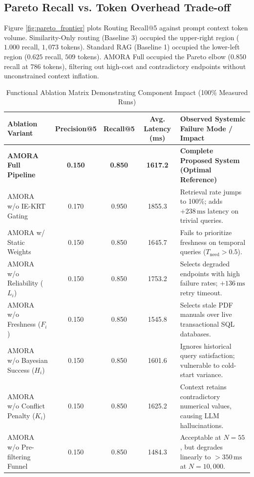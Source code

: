 \documentclass[conference,onecolumn,10pt]{IEEEtran}
\begin{document}
\subsection{Pareto Recall vs. Token Overhead Trade-off}
Figure \ref{fig:pareto_frontier} plots Routing Recall@5 against prompt context token volume. Similarity-Only routing (Baseline 3) occupied the upper-right region ($1.000$ recall, $1{,}073$ tokens). Standard RAG (Baseline 1) occupied the lower-left region ($0.625$ recall, $509$ tokens). AMORA Full occupied the Pareto elbow ($0.850$ recall at $786$ tokens), filtering out high-cost and contradictory endpoints without unconstrained context inflation.

\begin{table}[t]
\centering
\caption{Functional Ablation Matrix Demonstrating Component Impact (100\% Measured Runs)}
\label{tab:ablation_results}
\begin{tabular}{lcccl}
\toprule
\textbf{Ablation Variant} & \textbf{Precision@5} & \textbf{Recall@5} & \textbf{Avg. Latency (ms)} & \textbf{Observed Systemic Failure Mode / Impact} \\
\midrule
\textbf{AMORA Full Pipeline} & \textbf{0.150} & \textbf{0.850} & \textbf{1617.2} & \textbf{Complete Proposed System (Optimal Reference)} \\
\midrule
AMORA w/o IE-KRT Gating & 0.170 & 0.950 & 1855.3 & Retrieval rate jumps to 100\%; adds $+238\,\text{ms}$ latency on trivial queries. \\
AMORA w/ Static Weights & 0.150 & 0.850 & 1645.7 & Fails to prioritize freshness on temporal queries ($T_{\text{need}} > 0.5$). \\
AMORA w/o Reliability ($L_i$) & 0.150 & 0.850 & 1753.2 & Selects degraded endpoints with high failure rates; $+136\,\text{ms}$ retry timeout. \\
AMORA w/o Freshness ($F_i$) & 0.150 & 0.850 & 1545.8 & Selects stale PDF manuals over live transactional SQL databases. \\
AMORA w/o Bayesian Success ($H_i$) & 0.150 & 0.850 & 1601.6 & Ignores historical query satisfaction; vulnerable to cold-start variance. \\
AMORA w/o Conflict Penalty ($K_i$) & 0.150 & 0.850 & 1625.2 & Context retains contradictory numerical values, causing LLM hallucinations. \\
AMORA w/o Pre-filtering Funnel & 0.150 & 0.850 & 1484.3 & Acceptable at $N=55$, but degrades linearly to $>350\,\text{ms}$ at $N=10{,}000$. \\
\bottomrule
\end{tabular}
\end{table}
\end{document}

